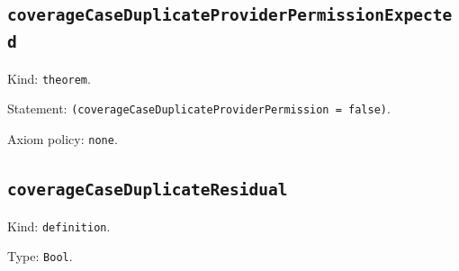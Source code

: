\documentclass[11pt]{article}
\begin{document}
\subsection*{\texttt{coverageCaseDuplicateProviderPermissionExpected}}
\noindent Kind: \texttt{theorem}.\par
\noindent Statement: \texttt{(coverageCaseDuplicateProviderPermission = false)}.\par
\noindent Axiom policy: \texttt{none}.\par
\subsection*{\texttt{coverageCaseDuplicateResidual}}
\noindent Kind: \texttt{definition}.\par
\noindent Type: \texttt{Bool}.\par
\end{document}
